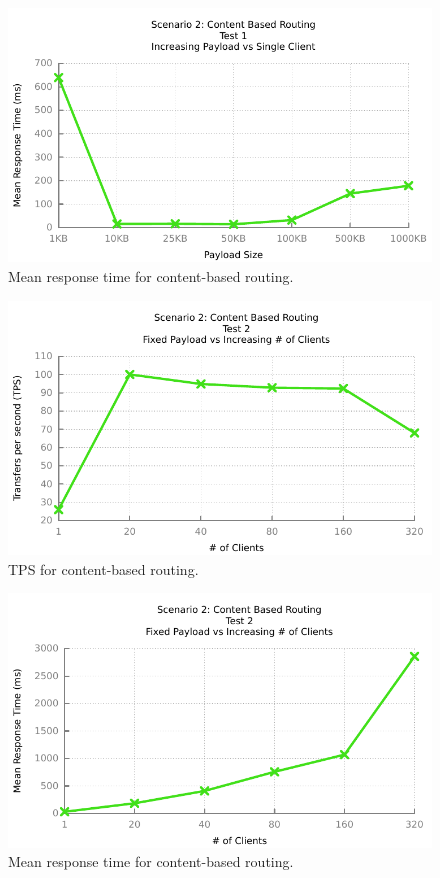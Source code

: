 \begin{figure}[H]
	\caption{Mean response time for content-based routing.}
	\centerline{\includegraphics{img/mediation_fu_ip_resp}}
	\label{fig:mediation-1-2}
\end{figure}

\begin{figure}[H]
	\caption{TPS for content-based routing.}
	\centerline{\includegraphics{img/mediation_fp_iu_tps}}
	\label{fig:mediation-2-1}
\end{figure}

\begin{figure}[H]
	\caption{Mean response time for content-based routing.}
	\centerline{\includegraphics{img/mediation_fp_iu_resp}}
	\label{fig:mediation-2-2}
\end{figure}

